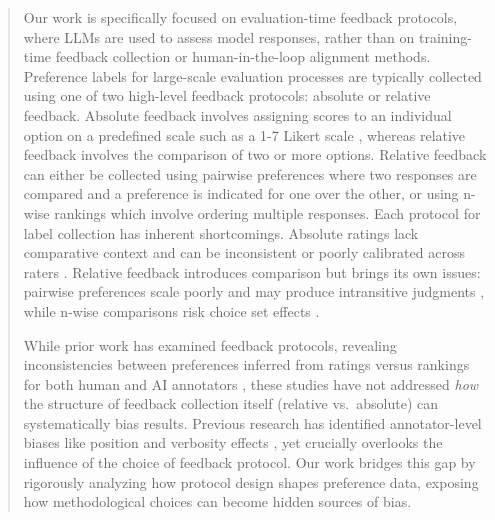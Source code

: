\documentclass{article}
\begin{document}
\begin{abstract}
Our work is specifically focused on evaluation-time feedback protocols, where LLMs are used to assess model responses, rather than on training-time feedback collection or human-in-the-loop alignment methods. Preference labels for large-scale evaluation processes are typically collected using one of two high-level feedback protocols: absolute or relative feedback. Absolute feedback involves assigning scores to an individual option on a predefined scale such as a 1-7 Likert scale \citep{zis-Likert1932A},  whereas relative feedback involves the comparison of two or more options. Relative feedback can either be collected using pairwise preferences where two responses are compared and a preference is indicated for one over the other, or using n-wise rankings which involve ordering multiple responses. Each protocol for label collection has inherent shortcomings. Absolute ratings lack comparative context and can be inconsistent or poorly calibrated across raters \citep{wadhwa2024using}. Relative feedback introduces comparison but brings its own issues: pairwise preferences scale poorly and may produce intransitive judgments \citep{xu2025investigatingnontransitivityllmasajudge}, while n-wise comparisons risk choice set effects \citep{Zhao_2024}. 

While prior work has examined feedback protocols, revealing inconsistencies between preferences inferred from ratings versus rankings for both human and AI annotators \citep{bansal2024peeringpreferencesunravelingfeedback}, these studies have not addressed \textit{how} the structure of feedback collection itself (relative vs.~absolute) can systematically bias results. Previous research has identified annotator-level biases like position and verbosity effects \citep{wang2023large, saito2023verbositybiaspreferencelabeling}, yet crucially overlooks the influence of the choice of feedback protocol. Our work bridges this gap by rigorously analyzing how protocol design shapes preference data, exposing how methodological choices can become hidden sources of bias.


\end{abstract}
\end{document}
